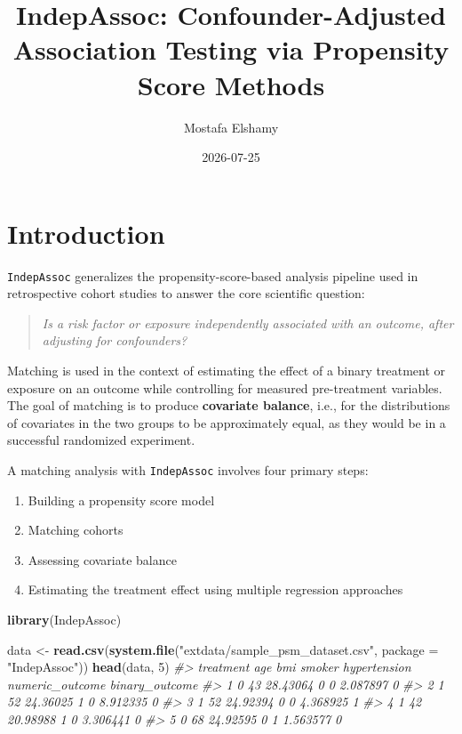 \documentclass[
]{article}
\title{IndepAssoc: Confounder-Adjusted Association Testing via
Propensity Score Methods}
\author{Mostafa Elshamy}
\date{2026-07-25}
\newenvironment{Shaded}{\begin{snugshade}}{\end{snugshade}}
\newcommand{\AttributeTok}[1]{\textcolor[rgb]{0.13,0.29,0.53}{#1}}
\newcommand{\CommentTok}[1]{\textcolor[rgb]{0.56,0.35,0.01}{\textit{#1}}}
\newcommand{\DecValTok}[1]{\textcolor[rgb]{0.00,0.00,0.81}{#1}}
\newcommand{\FunctionTok}[1]{\textcolor[rgb]{0.13,0.29,0.53}{\textbf{#1}}}
\newcommand{\NormalTok}[1]{#1}
\newcommand{\OtherTok}[1]{\textcolor[rgb]{0.56,0.35,0.01}{#1}}
\newcommand{\StringTok}[1]{\textcolor[rgb]{0.31,0.60,0.02}{#1}}
\providecommand{\tightlist}{%
  \setlength{\itemsep}{0pt}\setlength{\parskip}{0pt}}
\begin{document}
\maketitle

{
\setcounter{tocdepth}{3}
\tableofcontents
}
\section{Introduction}\label{introduction}

\texttt{IndepAssoc} generalizes the propensity-score-based analysis
pipeline used in retrospective cohort studies to answer the core
scientific question:

\begin{quote}
\emph{Is a risk factor or exposure independently associated with an
outcome, after adjusting for confounders?}
\end{quote}

Matching is used in the context of estimating the effect of a binary
treatment or exposure on an outcome while controlling for measured
pre-treatment variables. The goal of matching is to produce
\textbf{covariate balance}, i.e., for the distributions of covariates in
the two groups to be approximately equal, as they would be in a
successful randomized experiment.

A matching analysis with \texttt{IndepAssoc} involves four primary
steps:

\begin{enumerate}
\def\labelenumi{\arabic{enumi}.}
\tightlist
\item
  Building a propensity score model
\item
  Matching cohorts
\item
  Assessing covariate balance
\item
  Estimating the treatment effect using multiple regression approaches
\end{enumerate}

\begin{Shaded}
\begin{Highlighting}[]
\FunctionTok{library}\NormalTok{(IndepAssoc)}

\NormalTok{data }\OtherTok{\textless{}{-}} \FunctionTok{read.csv}\NormalTok{(}\FunctionTok{system.file}\NormalTok{(}\StringTok{"extdata/sample\_psm\_dataset.csv"}\NormalTok{, }\AttributeTok{package =} \StringTok{"IndepAssoc"}\NormalTok{))}
\FunctionTok{head}\NormalTok{(data, }\DecValTok{5}\NormalTok{)}
\CommentTok{\#\textgreater{}   treatment age      bmi smoker hypertension numeric\_outcome binary\_outcome}
\CommentTok{\#\textgreater{} 1         0  43 28.43064      0            0        2.087897              0}
\CommentTok{\#\textgreater{} 2         1  52 24.36025      1            0        8.912335              0}
\CommentTok{\#\textgreater{} 3         1  52 24.92394      0            0        4.368925              1}
\CommentTok{\#\textgreater{} 4         1  42 20.98988      1            0        3.306441              0}
\CommentTok{\#\textgreater{} 5         0  68 24.92595      0            1        1.563577              0}
\end{Highlighting}
\end{Shaded}
\end{document}
